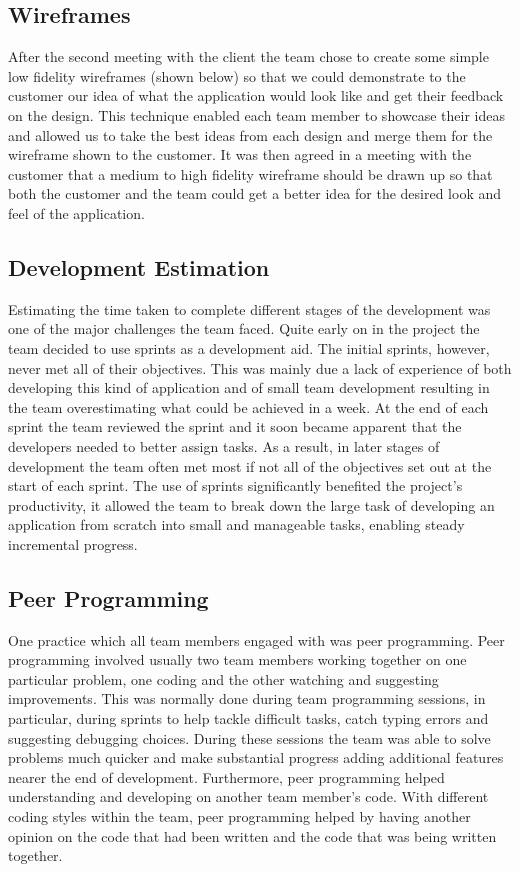 \documentclass{l3proj}
\begin{document}
\subsection{Wireframes}
After the second meeting with the client the team chose to create some simple low fidelity wireframes (shown below) so that we could demonstrate to the customer our idea of what the application would look like and get their feedback on the design. This technique enabled each team member to showcase their ideas and allowed us to take the best ideas from each design and merge them for the wireframe shown to the customer. It was then agreed in a meeting with the customer that a medium to high fidelity wireframe should be drawn up so that both the customer and the team could get a better idea for the desired look and feel of the application.

\subsection{Development Estimation}
Estimating the time taken to complete different stages of the development was one of the major challenges the team faced. Quite early on in the project the team decided to use sprints as a development aid. The initial sprints, however, never met all of their objectives. This was mainly due a lack of experience of  both developing this kind of application and of small team development resulting in the team overestimating what could be achieved in a week. At the end of each sprint the team reviewed the sprint and it soon became apparent that the developers needed to better assign tasks. As a result, in later stages of development the team often met most if not all of the objectives set out at the start of each sprint. The use of sprints significantly benefited the project's productivity, it allowed the team to break down the large task of developing an application from scratch into small and manageable tasks, enabling steady incremental progress.

\subsection{Peer Programming}
One practice which all team members engaged with was peer programming. Peer programming involved usually two team members working together on one particular problem, one coding and the other watching and suggesting improvements. This was normally done during team programming sessions, in particular, during sprints to help tackle difficult tasks, catch typing errors and suggesting debugging choices. During these sessions the team was able to solve problems much quicker and make substantial progress adding additional features nearer the end of development. Furthermore, peer programming helped understanding and developing on another team member's code. With different coding styles within the team, peer programming helped by having another opinion on the code that had been written and the code that was being written together. 
\end{document}
